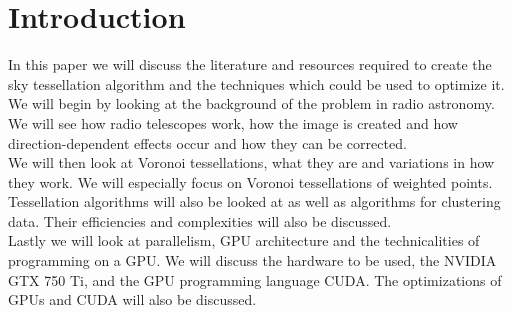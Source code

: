 \section{Introduction}\label{int}
In this paper we will discuss the literature and resources required to create the sky tessellation algorithm and the techniques which could be used to optimize it.
\\
We will begin by looking at the background of the problem in radio astronomy. We will see how radio telescopes work, how the image is created and how direction-dependent effects occur and how they can be corrected.
\\
We will then look at Voronoi tessellations, what they are and variations in how they work. We will especially focus on Voronoi tessellations of weighted points. Tessellation algorithms will also be looked at as well as algorithms for clustering data. Their efficiencies and complexities will also be discussed.
\\
Lastly we will look at parallelism, GPU architecture and the technicalities of programming on a GPU. We will discuss the hardware to be used, the NVIDIA GTX 750 Ti, and the GPU programming language CUDA. The optimizations of GPUs and CUDA will also be discussed.
